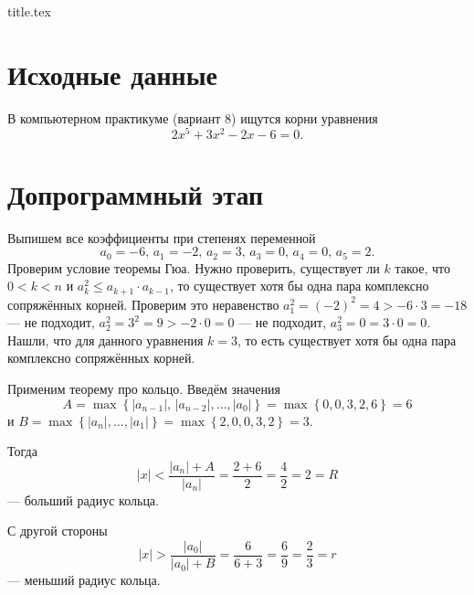 




{title.tex}

\clearpage



\clearpage
{}
\pagestyle{fancy}
\setcounter{page}{2}

\clearpage

\chapter{Исходные данные}

В компьютерном практикуме (вариант 8) ищутся корни уравнения
\begin{equation} \label{eq:1}
2x^5 + 3x^2 - 2x - 6 = 0.
\end{equation}

\chapter{Допрограммный этап}

Выпишем все коэффициенты при степенях переменной
$$a_0 = - 6, \, a_1 = - 2, \, a_2 = 3, \, a_3 = 0, \, a_4 = 0, \, a_5 = 2.$$
Проверим условие теоремы Гюа.
Нужно проверить, существует ли $k$ такое, что $0 < k < n$ и $a_k^2 \leq a_{k+1} \cdot a_{k-1}$, то существует хотя бы одна пара комплексно сопряжённых корней.
Проверим это неравенство $a_1^2 = \left( - 2 \right)^2 = 4 > - 6 \cdot 3 =  - 18$ --- не подходит, $a_2^2 = 3^2 = 9 > - 2 \cdot 0 = 0$ --- не подходит, 
$a_3^2 = 0 = 3 \cdot 0 = 0$.
Нашли, что для данного уравнения $k = 3$, то есть существует хотя бы одна пара комплексно сопряжённых корней.

Применим теорему про кольцо.
Введём значения
$$A =
\max \left\{ \left| a_{n - 1} \right|, \, \left| a_{n - 2} \right|, \dotsc, \left| a_0 \right| \right\} =
\max \left\{ 0, 0, 3, 2, 6 \right\} =
6$$
и $B = \max \left\{ \left| a_n \right|, \dotsc, \left| a_1 \right| \right\} = \max \left\{ 2, 0, 0, 3, 2 \right\} = 3$.

Тогда
$$ \left| x \right| <
\frac{ \left| a_n \right| + A}{ \left| a_n \right| } =
\frac{2 + 6}{2} =
\frac{4}{2} =
2 =
R$$
--- больший радиус кольца.

С другой стороны
$$ \left| x \right| >
\frac{ \left| a_0 \right| }{ \left| a_0 \right| + B} =
\frac{6}{6 + 3} =
\frac{6}{9} =
\frac{2}{3} =
r$$
--- меньший радиус кольца.

